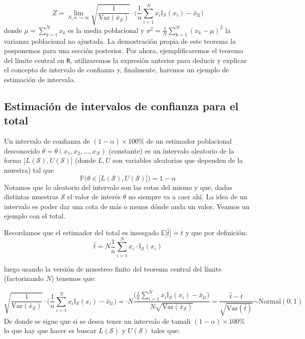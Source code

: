 \documentclass[
]{book}
\begin{document}
\[
Z =\lim_{N, n \to \infty} \sqrt{\frac{1}{\textrm{Var}(\bar{x}_{\mathcal{S}})}} \cdot  \Big( \frac{1}{n}\sum_{i = 1}^N x_i \mathbb{I}_{\mathcal{S}}(x_i) - \bar{x}_{\mathcal{U}}\Big)
\]
donde \(\mu = \sum_{k = 1}^N x_k\) es la media poblacional y \(\sigma^2 = \frac{1}{N} \sum_{k = 1}^N (x_k - \mu)^2\) la varianza poblacional no ajustada. La demostración propia de este teorema la posponemos para una sección posterior. Por ahora, ejemplificaremos el teorema del límite central en \texttt{R}, utilizaremos la expresión anterior para deducir y explicar el concepto de intervalo de confianza y, finalmente, haremos un ejemplo de estimación de intervalo.

\hypertarget{estimaciuxf3n-de-intervalos-de-confianza-para-el-total}{%
\subsection{Estimación de intervalos de confianza para el total}\label{estimaciuxf3n-de-intervalos-de-confianza-para-el-total}}

Un intervalo de confianza de \((1 - \alpha)\times 100 \%\) de un estimador poblacional desconocido \(\theta = \theta(x_1, x_2, \dots, x_N)\) (constante) es un intervalo aleatorio de la forma \(\big[ L(\mathcal{S}), U(\mathcal{S}) \big]\) (donde \(L, U\) son variables aleatorias que dependen de la muestra) tal que
\[
\mathbb{P}\Big( \theta \in \big[ L(\mathcal{S}), U(\mathcal{S}) \big]\Big) = 1 - \alpha
\]
Notamos que lo aleatorio del intervalo son las cotas del mismo y que, dadas distintas muestras \(\mathcal{S}\) el valor de interés \(\theta\) no siempre va a caer ahí. La idea de un intervalo es poder dar una cota de más o menos dónde anda un valor. Veamos un ejemplo con el total.

Recordamos que el estimador del total es insesgado \(\mathbb{E}\big[ \hat{t} \big] = t\) y que por definición:
\[
\hat{t} = N \frac{1}{n}\sum\limits_{i = 1}^N x_i \cdot \mathbb{I}_{\mathcal{S}}(x_i) 
\]

luego usando la versión de muestreo finito del teorema central del límite (factorizando \(N\)) tenemos que:

\[
\sqrt{\frac{1}{\textrm{Var}(\bar{x}_{\mathcal{S}})}} \cdot  \Big( \frac{1}{n}\sum_{i = 1}^N x_i \mathbb{I}_{\mathcal{S}}(x_i) - \bar{x}_{\mathcal{U}}\Big) = 
 \cdot  N\dfrac{\Big( \frac{1}{n}\sum_{i = 1}^N x_i \mathbb{I}_{\mathcal{S}}(x_i) - \bar{x}_{\mathcal{U}}\Big)}{N\sqrt{\textrm{Var}(\bar{x}_{\mathcal{S}})}}
=  \dfrac{\hat{t} - t}{\sqrt{\textrm{Var}(\hat{t})}}  \mathrel{\dot\sim} \textrm{Normal}(0,1)
\]
De donde se sigue que si se desea tener un intervalo de tamali \((1 - \alpha) \times 100 \%\) lo que hay que hacer es buscar \(L(\mathcal{S})\) y \(U(\mathcal{S})\) tales que:
\end{document}
